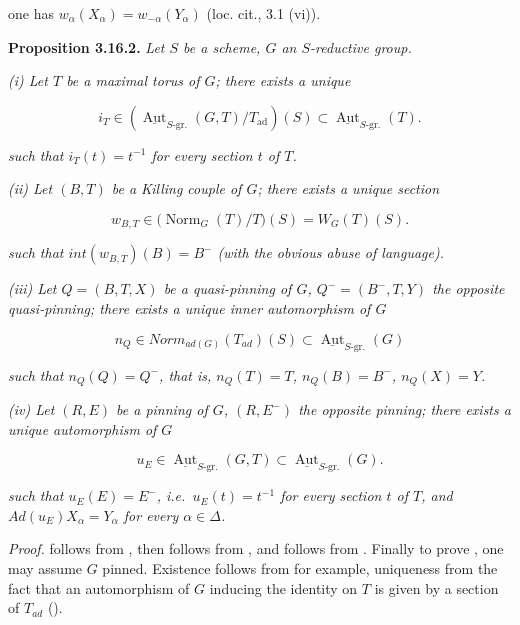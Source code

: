 one has \(w_{\alpha}(X_{\alpha}) = w_{-\alpha}(Y_{\alpha})\) (loc. cit., 3.1 (vi)).

\textbf{Proposition 3.16.2.} \emph{Let \(S\) be a scheme, \(G\) an \(S\)-reductive group.}

\emph{(i) Let \(T\) be a maximal torus of \(G\); there exists a unique}

\[
  i_T\in
  \left(
    \underline{\operatorname{Aut}}_{S\text{-}\mathrm{gr.}}(G,T)/T_{\mathrm{ad}}
  \right)(S)
  \subset
  \underline{\operatorname{Aut}}_{S\text{-}\mathrm{gr.}}(T).
\]

\emph{such that \(i_{T}(t) = t^{-1}\) for every section \(t\) of \(T\).}

\emph{(ii) Let \((B, T)\) be a Killing couple of \(G\); there exists a unique section}

\[
  w_{B,T}\in
  \bigl(\operatorname{Norm}_G(T)/T\bigr)(S)=W_G(T)(S).
\]

\emph{such that \(int(w_{B, T})(B) = B^{-}\) (with the obvious abuse of language).}

\emph{(iii) Let \(Q = (B, T, X)\) be a quasi-pinning of \(G\), \(Q^{-} = (B^{-}, T, Y)\) the opposite quasi-pinning; there exists a
unique inner automorphism of \(G\)}

\[ n_{Q} \in Norm_{ad(G)}(T_{ad})(S) \subset \underline{\operatorname{Aut}}_{S\text{-}\mathrm{gr.}}(G) \]

\emph{such that \(n_{Q}(Q) = Q^{-}\), that is, \(n_{Q}(T) = T\), \(n_{Q}(B) = B^{-}\), \(n_{Q}(X) = Y\).}

\emph{(iv) Let \((R, E)\) be a pinning of \(G\), \((R, E^{-})\) the opposite pinning; there exists a unique automorphism of \(G\)}

\[
  u_E\in
  \underline{\operatorname{Aut}}_{S\text{-}\mathrm{gr.}}(G,T)
  \subset
  \underline{\operatorname{Aut}}_{S\text{-}\mathrm{gr.}}(G).
\]

\emph{such that \(u_{E}(E) = E^{-}\), i.e.~\(u_{E}(t) = t^{-1}\) for every section \(t\) of \(T\), and \(Ad(u_{E}) X_{\alpha} =
Y_{\alpha}\) for every \(\alpha \in \Delta\).}

\emph{Proof.}  follows from , then  follows from , and  follows from .
Finally to prove , one may assume \(G\) pinned. Existence follows from  for example, uniqueness from the fact that
an automorphism of \(G\) inducing the identity on \(T\) is given by a section of \(T_{ad}\) ().

